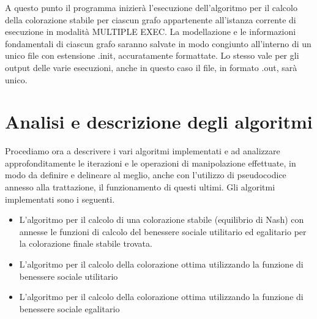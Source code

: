 A questo punto il programma inizierà l'esecuzione dell'algoritmo per il calcolo della colorazione stabile per ciascun grafo appartenente all'istanza corrente di esecuzione in modalità MULTIPLE EXEC. La modellazione e le informazioni fondamentali di ciascun grafo saranno salvate in modo congiunto all'interno di un unico file con estensione .init, accuratamente formattate. Lo stesso vale per gli output delle varie esecuzioni, anche in questo caso il file, in formato .out, sarà unico.\\

\section{Analisi e descrizione degli algoritmi}
\justify

Procediamo ora a descrivere i vari algoritmi implementati e ad analizzare approfonditamente le iterazioni e le operazioni di manipolazione effettuate, in modo da definire e delineare al meglio, anche con l'utilizzo di pseudocodice annesso alla trattazione, il funzionamento di questi ultimi. Gli algoritmi implementati sono i seguenti.

\begin{itemize}
	\item L'algoritmo per il calcolo di una colorazione stabile (equilibrio di Nash) con annesse le funzioni di calcolo del benessere sociale utilitario ed egalitario per la colorazione finale stabile trovata.
	\item L'algoritmo per il calcolo della colorazione ottima utilizzando la funzione di benessere sociale utilitario 
	\item L'algoritmo per il calcolo della colorazione ottima utilizzando la funzione di benessere sociale egalitario 
\end{itemize}

\newpage

